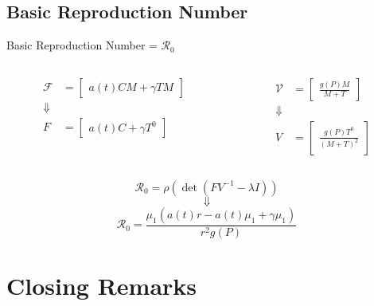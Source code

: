 \documentclass{beamer}
\begin{document}
\subsection{Basic Reproduction Number}
\begin{frame}{Basic Reproduction Number = $\mathscr{R}_{0}$}
    \begin{columns}
        \begin{column}{0.5\textwidth}
            \begin{align*}
                \mathscr{F} &= \begin{bmatrix} a(t)CM+\gamma TM \end{bmatrix}\\
                \Downarrow\\
                F &= \begin{bmatrix} a(t)C + \gamma T^{0} \end{bmatrix}
            \end{align*}
        \end{column}
        \begin{column}{0.5\textwidth}
            \begin{align*}
                \mathscr{V} &= \begin{bmatrix} \frac{g(P)M}{M+T} \end{bmatrix}\\
                \Downarrow\\
                V &= \begin{bmatrix} \frac{g(P)T^{0}}{(M+T)^{2}} \end{bmatrix}
            \end{align*}
        \end{column}
    \end{columns}
    $$\mathscr{R}_{0} = \rho(\det(FV^{-1} - \lambda I))$$
    $$\Downarrow$$
    $$\displaystyle {\mathscr{R}}_{0} = \frac{\mu_{1}(a(t) r - a(t)\mu_{1} + \gamma \mu_{1})}{r^{2}g(P)}$$
\end{frame}



\section{Closing Remarks}
\end{document}
